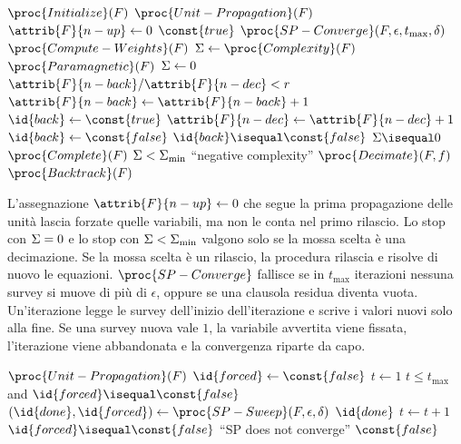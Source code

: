 \begin{codebox}
\li $\proc{Initialize}(F)$
\li $\proc{Unit-Propagation}(F)$
\li $\attrib{F}{n-up} \gets 0$
\li \While $\const{true}$
\li     \Do
            $\proc{SP-Converge}(F, \epsilon, t_{\max}, \delta)$
\li         $\proc{Compute-Weights}(F)$
\li         $\Sig \gets \proc{Complexity}(F)$
\li         \If $\proc{Paramagnetic}(F)$
\li             \Then $\Sigma \gets 0$
                \End
\li         \If $\attrib{F}{n-back} / \attrib{F}{n-dec} < r$
\li             \Then
                    $\attrib{F}{n-back} \gets \attrib{F}{n-back}+1$
\li                 $\id{back} \gets \const{true}$
\li             \Else
                    $\attrib{F}{n-dec} \gets \attrib{F}{n-dec}+1$
\li                 $\id{back} \gets \const{false}$
                \End
\li         \If $\id{back} \isequal \const{false}$
\li             \Then
                    \If $\Sig \isequal 0$
\li                     \Then \Return $\proc{Complete}(F)$
                        \End
\li                 \If $\Sigma < \Sigma_{\min}$
\li                     \Then \Error ``negative complexity''
                        \End
\li                 $\proc{Decimate}(F, f)$
\li             \Else $\proc{Backtrack}(F)$
                \End
        \End
\end{codebox}

L'assegnazione $\attrib{F}{n-up}\gets 0$ che segue la prima propagazione delle unità lascia forzate quelle variabili, ma non le conta nel primo rilascio.
Lo stop con $\Sigma=0$ e lo stop con $\Sigma<\Sigma_{\min}$ valgono solo se la mossa scelta è una decimazione.
Se la mossa scelta è un rilascio, la procedura rilascia e risolve di nuovo le equazioni.
$\proc{SP-Converge}$ fallisce se in $t_{\max}$ iterazioni nessuna survey si muove di più di $\epsilon$, oppure se una clausola residua diventa vuota.
Un'iterazione legge le survey dell'inizio dell'iterazione e scrive i valori nuovi solo alla fine.
Se una survey nuova vale $1$, la variabile avvertita viene fissata, l'iterazione viene abbandonata e la convergenza riparte da capo.

\begin{codebox}
\li \Repeat
\li     $\proc{Unit-Propagation}(F)$
\li     $\id{forced} \gets \const{false}$
\li     $t \gets 1$
\li     \While $t \leq t_{\max}$ and $\id{forced} \isequal \const{false}$
\li         \Do
                $(\id{done}, \id{forced}) \gets \proc{SP-Sweep}(F, \epsilon, \delta)$
\li             \If $\id{done}$
\li                 \Then \Return
                    \End
\li             $t \gets t + 1$
            \End
\li     \If $\id{forced} \isequal \const{false}$
\li         \Then \Error ``SP does not converge''
            \End
\li \Until $\const{false}$
\end{codebox}

